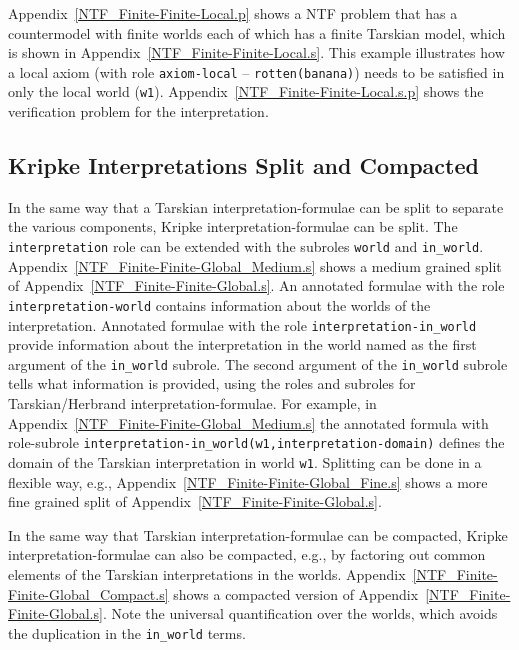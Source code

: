 \documentclass{easychair}
\begin{document}
Appendix~\ref{NTF_Finite-Finite-Local.p} shows a NTF problem that has a countermodel with
finite worlds each of which has a finite Tarskian model, which is shown in
Appendix~\ref{NTF_Finite-Finite-Local.s}.
This example illustrates how a local axiom (with role {\tt axiom-local} -- {\tt rotten(banana)})
needs to be satisfied in only the local world ({\tt w1}).
Appendix~\ref{NTF_Finite-Finite-Local.s.p} shows the verification problem for the interpretation.

\subsection{Kripke Interpretations Split and Compacted}
\label{NewKripkeSplitCompact}

In the same way that a Tarskian interpretation-formulae can be split to separate the various 
components, Kripke interpretation-formulae can be split.
The {\tt interpretation} role can be extended with the subroles {\tt world} and {\tt in\_world}.
Appendix~\ref{NTF_Finite-Finite-Global_Medium.s} shows a medium grained split of 
Appendix~\ref{NTF_Finite-Finite-Global.s}.
An annotated formulae with the role {\tt interpretation-world} contains information about the
worlds of the interpretation.
Annotated formulae with the role {\tt interpretation-in\_world} provide information about the
interpretation in the world named as the first argument of the {\tt in\_world} subrole.
The second argument of the {\tt in\_world} subrole tells what information is provided, using the
roles and subroles for Tarskian/Herbrand interpretation-formulae.
For example, in Appendix~\ref{NTF_Finite-Finite-Global_Medium.s} the annotated formula with
role-subrole {\tt interpretation-in\_world(w1,interpretation-domain)} defines the domain of the
Tarskian interpretation in world {\tt w1}.
Splitting can be done in a flexible way, e.g., Appendix~\ref{NTF_Finite-Finite-Global_Fine.s}
shows a more fine grained split of Appendix~\ref{NTF_Finite-Finite-Global.s}.

In the same way that Tarskian interpretation-formulae can be compacted, Kripke
interpretation-formulae can also be compacted, e.g., by factoring out common elements of
the Tarskian interpretations in the worlds.
Appendix~\ref{NTF_Finite-Finite-Global_Compact.s} shows a compacted version of
Appendix~\ref{NTF_Finite-Finite-Global.s}.
Note the universal quantification over the worlds, which avoids the duplication in the 
{\tt in\_world} terms.
\end{document}
